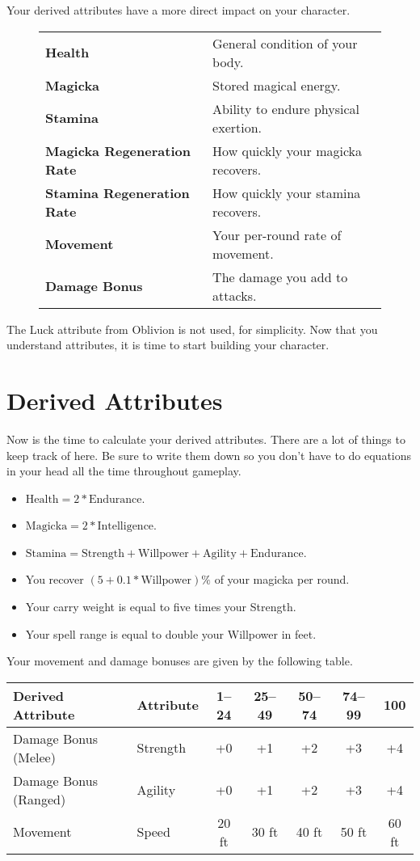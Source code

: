 Your derived attributes have a more direct impact on your character.
\begin{figure}[h]
\begin{tabular}[h]{p{}p{}}
	\textbf{Health} & General condition of your body.\\
	\textbf{Magicka} & Stored magical energy.\\
	\textbf{Stamina} & Ability to endure physical exertion.\\
	\textbf{Magicka Regeneration Rate} & How quickly your magicka recovers.\\
	\textbf{Stamina Regeneration Rate} & How quickly your stamina recovers.\\
	\textbf{Movement} & Your per-round rate of movement.\\
	\textbf{Damage Bonus} & The damage you add to attacks.\\
\end{tabular}
\end{figure}

The Luck attribute from Oblivion is not used, for simplicity. Now that you understand attributes, it is time to start building your character.





\section{Derived Attributes}
Now is the time to calculate your derived attributes. There are a lot of things to keep track of here. Be sure to write them down so you don't have to do equations in your head all the time throughout gameplay.
\begin{itemize}
	\item $\text{Health}=2*\text{Endurance}$.
	\item $\text{Magicka}=2*\text{Intelligence}$.
	\item $\text{Stamina}=\text{Strength}+\text{Willpower}+\text{Agility}+\text{Endurance}$.
	\item You recover $(5+0.1*\text{Willpower})\%$ of your magicka per round.
	\item Your carry weight is equal to five times your Strength.
	\item Your spell range is equal to double your Willpower in feet. 
\end{itemize}

Your movement and damage bonuses are given by the following table.
\begin{center}
\begin{tabular}{|l|l|c|c|c|c|c|}
\hline
Derived Attribute & Attribute & 1--24 & 25--49 & 50--74 & 74--99 & 100\\ \hline
Damage Bonus (Melee) & Strength & +0 & +1 & +2 & +3 & +4 \\ \hline
Damage Bonus (Ranged) & Agility & +0 & +1 & +2 & +3 & +4 \\ \hline
Movement & Speed & 20 ft & 30 ft & 40 ft & 50 ft & 60 ft\\ \hline
\end{tabular}
\end{center}

